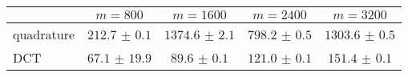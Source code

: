 \centering
\renewcommand{\arraystretch}{1.2}
\begin{tabular}{@{}lcccc@{}}
\toprule
 & $m=800$ & $m=1600$ & $m=2400$ & $m=3200$\\
\midrule
quadrature & $212.7$ $\pm$ $0.1$ & $1374.6$ $\pm$ $2.1$ & $798.2$ $\pm$ $0.5$ & $1303.6$ $\pm$ $0.5$ \\
DCT & $67.1$ $\pm$ $19.9$ & $89.6$ $\pm$ $0.1$ & $121.0$ $\pm$ $0.1$ & $151.4$ $\pm$ $0.1$ \\
\bottomrule
\end{tabular}
